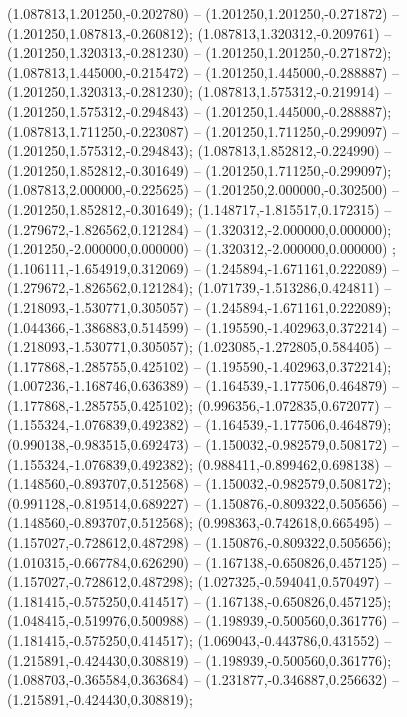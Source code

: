  (1.087813,1.201250,-0.202780) -- (1.201250,1.201250,-0.271872) -- (1.201250,1.087813,-0.260812);
 (1.087813,1.320312,-0.209761) -- (1.201250,1.320313,-0.281230) -- (1.201250,1.201250,-0.271872);
 (1.087813,1.445000,-0.215472) -- (1.201250,1.445000,-0.288887) -- (1.201250,1.320313,-0.281230);
 (1.087813,1.575312,-0.219914) -- (1.201250,1.575312,-0.294843) -- (1.201250,1.445000,-0.288887);
 (1.087813,1.711250,-0.223087) -- (1.201250,1.711250,-0.299097) -- (1.201250,1.575312,-0.294843);
 (1.087813,1.852812,-0.224990) -- (1.201250,1.852812,-0.301649) -- (1.201250,1.711250,-0.299097);
 (1.087813,2.000000,-0.225625) -- (1.201250,2.000000,-0.302500) -- (1.201250,1.852812,-0.301649);
 (1.148717,-1.815517,0.172315) -- (1.279672,-1.826562,0.121284) -- (1.320312,-2.000000,0.000000);
 (1.201250,-2.000000,0.000000) -- (1.320312,-2.000000,0.000000) ;
 (1.106111,-1.654919,0.312069) -- (1.245894,-1.671161,0.222089) -- (1.279672,-1.826562,0.121284);
 (1.071739,-1.513286,0.424811) -- (1.218093,-1.530771,0.305057) -- (1.245894,-1.671161,0.222089);
 (1.044366,-1.386883,0.514599) -- (1.195590,-1.402963,0.372214) -- (1.218093,-1.530771,0.305057);
 (1.023085,-1.272805,0.584405) -- (1.177868,-1.285755,0.425102) -- (1.195590,-1.402963,0.372214);
 (1.007236,-1.168746,0.636389) -- (1.164539,-1.177506,0.464879) -- (1.177868,-1.285755,0.425102);
 (0.996356,-1.072835,0.672077) -- (1.155324,-1.076839,0.492382) -- (1.164539,-1.177506,0.464879);
 (0.990138,-0.983515,0.692473) -- (1.150032,-0.982579,0.508172) -- (1.155324,-1.076839,0.492382);
 (0.988411,-0.899462,0.698138) -- (1.148560,-0.893707,0.512568) -- (1.150032,-0.982579,0.508172);
 (0.991128,-0.819514,0.689227) -- (1.150876,-0.809322,0.505656) -- (1.148560,-0.893707,0.512568);
 (0.998363,-0.742618,0.665495) -- (1.157027,-0.728612,0.487298) -- (1.150876,-0.809322,0.505656);
 (1.010315,-0.667784,0.626290) -- (1.167138,-0.650826,0.457125) -- (1.157027,-0.728612,0.487298);
 (1.027325,-0.594041,0.570497) -- (1.181415,-0.575250,0.414517) -- (1.167138,-0.650826,0.457125);
 (1.048415,-0.519976,0.500988) -- (1.198939,-0.500560,0.361776) -- (1.181415,-0.575250,0.414517);
 (1.069043,-0.443786,0.431552) -- (1.215891,-0.424430,0.308819) -- (1.198939,-0.500560,0.361776);
 (1.088703,-0.365584,0.363684) -- (1.231877,-0.346887,0.256632) -- (1.215891,-0.424430,0.308819);
